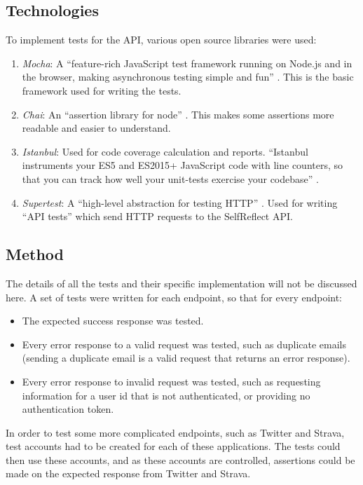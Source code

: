 \documentclass[11pt,openright,a4paper]{report}
\begin{document}
\subsection{Technologies}
To implement tests for the API, various open source libraries were used:
\begin{enumerate}
\item \emph{Mocha}: A \enquote{feature-rich JavaScript test framework running on Node.js and in the browser, making asynchronous testing simple and fun} \parencite{mocha}. This is the basic framework used for writing the tests.
\item \emph{Chai}: An \enquote{assertion library for node} \parencite{chai}. This makes some assertions more readable and easier to understand.
\item \emph{Istanbul}: Used for code coverage calculation and reports. \enquote{Istanbul instruments your ES5 and ES2015+ JavaScript code with line counters, so that you can track how well your unit-tests exercise your codebase} \parencite{instanbul}.
\item \emph{Supertest}: A \enquote{high-level abstraction for testing HTTP} \parencite{supertest}. Used for writing \enquote{API tests} which send HTTP requests to the SelfReflect API.
\end{enumerate}

\subsection{Method}
The details of all the tests and their specific implementation will not be discussed here. A set of tests were written for each endpoint, so that for every endpoint:
\begin{itemize}
\item The expected success response was tested.
\item Every error response to a valid request was tested, such as duplicate emails (sending a duplicate email is a valid request that returns an error response).
\item Every error response to invalid request was tested, such as requesting information for a user id that is not authenticated, or providing no authentication token.
\end{itemize}

In order to test some more complicated endpoints, such as Twitter and Strava, test accounts had to be created for each of these applications. The tests could then use these accounts, and as these accounts are controlled, assertions could be made on the expected response from Twitter and Strava.
\end{document}
